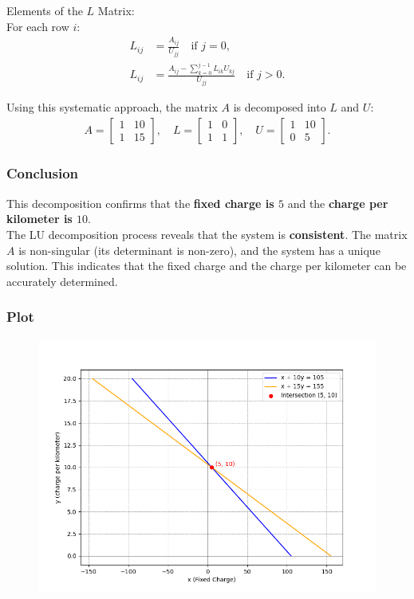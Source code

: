 \documentclass{beamer}
\begin{document}
\begin{frame}
\frametitle{}
Elements of the \( L \) Matrix: \\
For each row \( i \):
\begin{align}
    L_{ij} &= \frac{A_{ij}}{U_{jj}} \quad \text{if } j = 0, \\
    L_{ij} &= \frac{A_{ij} - \sum_{k=0}^{j-1} L_{ik} U_{kj}}{U_{jj}} \quad \text{if } j > 0.
\end{align}

Using this systematic approach, the matrix \( A \) is decomposed into \( L \) and \( U \):
\begin{align}
    A = \begin{bmatrix}1 & 10\\1 & 15\end{bmatrix}, \quad L = \begin{bmatrix}1 & 0\\1 & 1\end{bmatrix}, \quad U = \begin{bmatrix}1 & 10\\0 & 5\end{bmatrix}.
\end{align}
    
\end{frame}
\begin{frame}
\frametitle{Conclusion}
This decomposition confirms that the \textbf{fixed charge is $ 5 $}  and the \textbf{charge per kilometer is $ 10 $}.\\


The LU decomposition process reveals that the system is \textbf{consistent}. The matrix \( A \) is non-singular (its determinant is non-zero), and the system has a unique solution. This indicates that the fixed charge and the charge per kilometer can be accurately determined.\\
    
\end{frame}
\begin{frame}
\frametitle{Plot}
\begin{figure}[h!]
	\centering
	\includegraphics[width=0.7\linewidth]{figs/Figure_1.png}
	\label{stemplot}
\end{figure}	
\end{frame}
\end{document}
